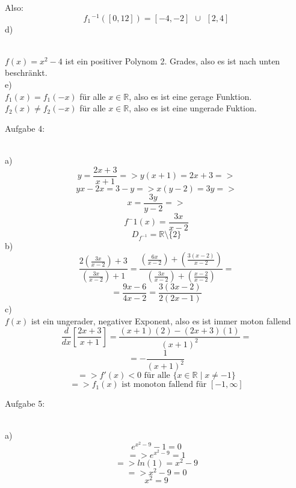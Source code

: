 \documentclass[11pt]{article}
\begin{document}
				Also:\\
				$$f_1 \hspace{1pt}^{-1}([0,12])=[-4,-2] \hspace{5pt} \cup \hspace{5pt} [2,4]$$
			\indent d)\\
				\\
			$f(x)=x^2-4$ ist ein positiver Polynom 2. Grades, also es ist nach unten beschränkt.\\
			\indent e)\\
				$f_1(x)=f_1(-x)$ für alle $x\in\mathbb{R}$, also es ist eine gerage Funktion.\\
				$f_2(x) \neq f_2(-x)$ für alle $x\in\mathbb{R}$, also es ist eine ungerade Fuktion.\\
		\noindent \begin{Large}Aufgabe 4:\end{Large}\\[2pt]
			\indent a)
				$$y=\frac{2x+3}{x+1} => y(x+1)=2x+3=>$$
				$$yx-2x=3-y => x(y-2)=3y=>$$
				$$x=\frac{3y}{y-2}=>$$
				$$f^-1(x)=\frac{3x}{x-2}$$
				$$D_{f^{-1}}=\mathbb{R}\setminus\{2\}$$
			\indent b)
				$$\frac{2\left(\frac{3x}{x-2}\right)+3}{\left(\frac{3x}{x-2}\right)+1}=\frac{\left(\frac{6x}{x-2}\right)+\left(\frac{3(x-2)}{x-2}\right)}{\left(\frac{3x}{x-2}\right)+\left(\frac{x-2}{x-2}\right)}=$$
				$$=\frac{9x-6}{4x-2}=\frac{3(3x-2)}{2(2x-1)}$$
			\indent c)\\
				$f(x)$ ist ein ungerader, negativer Exponent, also es ist immer moton fallend\\
				$$\frac{d}{dx}\left[\frac{2x+3}{x+1}\right]=\frac{(x+1)(2)-(2x+3)(1)}{(x+1)^2}=$$
				$$=-\frac{1}{(x+1)^2}$$
				$$=> f'(x)<0  \mbox{ für alle } \{x \in \mathbb{R} \mid x \neq -1\}$$
				$$=> f_1(x) \mbox{ ist monoton fallend  für }[-1,\infty] $$		
		\noindent \begin{Large}Aufgabe 5:\end{Large}\\[2pt]
			\indent a)
				$$e^{x^2-9}-1=0$$
				$$=> e^{x^2-9}=1$$
				$$=>ln(1)=x^2-9$$
				$$=>x^2-9=0$$
				$$x^2=9$$
\end{document}
